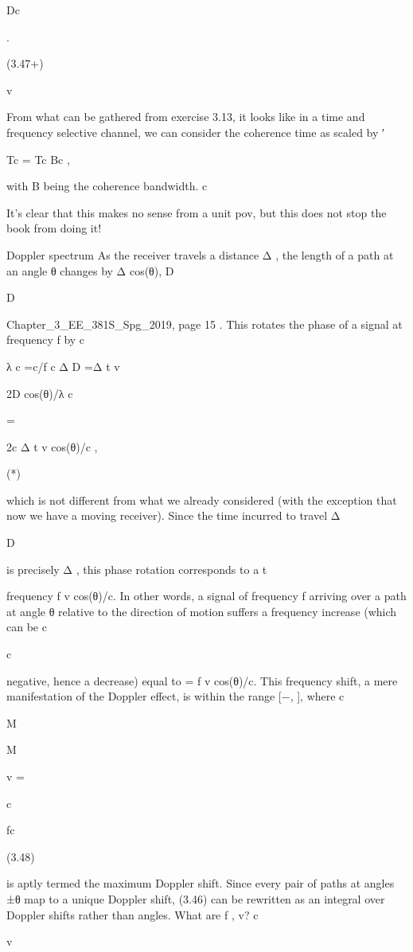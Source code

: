 {{{{Dc

.

(3.47+)

v

From what can be gathered from exercise 3.13, it looks like in a time and frequency selective channel, we can consider the coherence time as scaled by
′

Tc = Tc Bc ,

with B being the coherence bandwidth.
c

It's clear that this makes no sense from a unit pov, but this does not stop the book from doing it!

Doppler spectrum As the receiver travels a distance Δ , the length of a path at an angle θ changes by Δ cos(θ),
D

D

Chapter_3_EE_381S_Spg_2019, page 15
.
This rotates the phase of a signal at frequency f by c

λ c =c/f c Δ D =Δ t v

2 D cos(θ)/λ c

=

2\pif c Δ t v cos(θ)/c ,

(*)

which is not different from what we already considered (with the exception that now we have a moving receiver).
Since the time incurred to travel Δ

D

is precisely Δ , this phase rotation corresponds to a t

frequency f v cos(θ)/c. In other words, a signal of frequency f arriving over a path at angle θ relative to the direction of motion suffers a frequency increase (which can be c

c

negative, hence a decrease) equal to \nu = f v cos(θ)/c. This frequency shift, a mere manifestation of the Doppler effect, is within the range [−\nu , \nu ], where c

M

M

v
\nuM =

c

fc

(3.48)

is aptly termed the maximum Doppler shift. Since every pair of paths at angles ±θ map to a unique Doppler shift, (3.46) can be rewritten as an integral over Doppler shifts rather than angles.
​What are f , v?
c

v

}}}}
